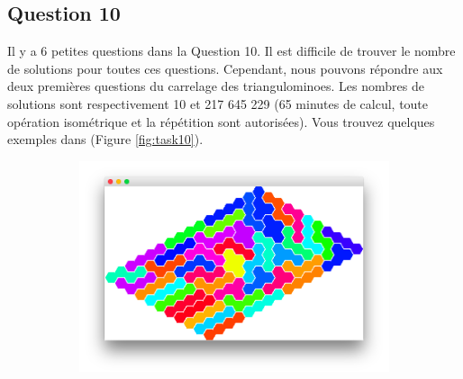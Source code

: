 \documentclass[a4paper,12pt]{article}
\begin{document}
\subsection{Question 10}
Il y a 6 petites questions dans la Question 10.  Il est difficile de trouver le nombre de solutions pour toutes ces questions. Cependant, nous pouvons répondre aux deux premières questions du carrelage des triangulominoes. Les nombres de solutions sont respectivement 10 et 217 645 229 (65 minutes de calcul, toute opération isométrique et la répétition sont autorisées). Vous trouvez quelques exemples dans (Figure \ref{fig:task10}).

\begin{figure}[h!]
	\centering
	\begin{subfigure}{0.6\textwidth}
		\includegraphics[width=\textwidth]{figures/task10_1.png}
		\caption{}
	\end{subfigure}
	\\
	\begin{subfigure}{0.22\textwidth}

\end{subfigure}
\end{figure}
\end{document}
